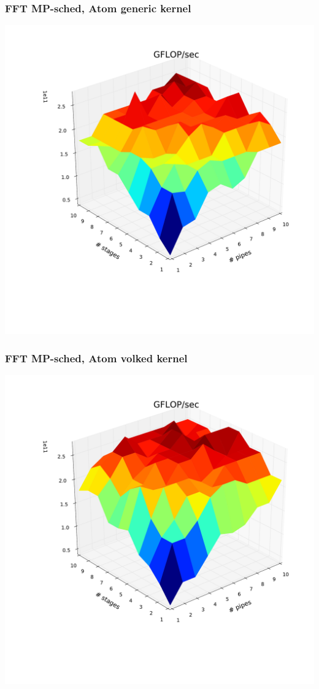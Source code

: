 \documentclass{beamer}
\begin{document}
\begin{frame}
  \frametitle{FFT MP-sched, Atom generic kernel}
  \includegraphics[width=\columnwidth]{../images/fft_i7_generic}
\end{frame}
\begin{frame}
  \frametitle{FFT MP-sched, Atom volked kernel}
  \includegraphics[width=\columnwidth]{../images/fft_i7_volked}
\end{frame}
\end{document}
